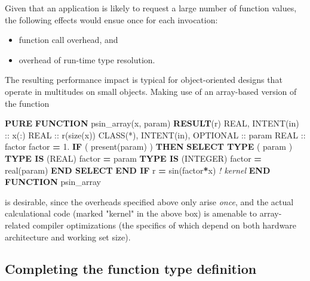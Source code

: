 \documentclass[]{scrartcl}
\newenvironment{Shaded}{}{}
\newcommand{\BuiltInTok}[1]{\textcolor[rgb]{0.00,0.50,0.00}{#1}}
\newcommand{\CommentTok}[1]{\textcolor[rgb]{0.38,0.63,0.69}{\textit{#1}}}
\newcommand{\DataTypeTok}[1]{\textcolor[rgb]{0.56,0.13,0.00}{#1}}
\newcommand{\FloatTok}[1]{\textcolor[rgb]{0.25,0.63,0.44}{#1}}
\newcommand{\FunctionTok}[1]{\textcolor[rgb]{0.02,0.16,0.49}{#1}}
\newcommand{\KeywordTok}[1]{\textcolor[rgb]{0.00,0.44,0.13}{\textbf{#1}}}
\newcommand{\NormalTok}[1]{#1}
\providecommand{\tightlist}{%
  \setlength{\itemsep}{0pt}\setlength{\parskip}{0pt}}
\begin{document}
Given that an application is likely to request a large number of
function values, the following effects would ensue once for each
invocation:

\begin{itemize}
\tightlist
\item
  function call overhead, and
\item
  overhead of run-time type resolution.
\end{itemize}

The resulting performance impact is typical for object-oriented designs
that operate in multitudes on small objects. Making use of an
array-based version of the function

\begin{Shaded}
\begin{Highlighting}[]
\KeywordTok{PURE} \KeywordTok{FUNCTION}\NormalTok{ psin\_array(x, param) }\KeywordTok{RESULT}\NormalTok{(r)}
   \DataTypeTok{REAL}\NormalTok{, }\DataTypeTok{INTENT(in)} \DataTypeTok{::}\NormalTok{ x(:)}
   \DataTypeTok{REAL} \DataTypeTok{::}\NormalTok{ r(}\FunctionTok{size}\NormalTok{(x))}
   \DataTypeTok{CLASS(*)}\NormalTok{, }\DataTypeTok{INTENT(in)}\NormalTok{, }\DataTypeTok{OPTIONAL} \DataTypeTok{::}\NormalTok{ param}
   \DataTypeTok{REAL} \DataTypeTok{::}\NormalTok{ factor}
\NormalTok{   factor }\KeywordTok{=} \FloatTok{1.}
   \KeywordTok{IF}\NormalTok{ ( }\FunctionTok{present}\NormalTok{(param) ) }\KeywordTok{THEN}
      \KeywordTok{SELECT TYPE}\NormalTok{ ( param )}
      \KeywordTok{TYPE IS}\NormalTok{ (}\DataTypeTok{REAL}\NormalTok{)}
\NormalTok{         factor }\KeywordTok{=}\NormalTok{ param}
      \KeywordTok{TYPE IS}\NormalTok{ (}\DataTypeTok{INTEGER}\NormalTok{)}
\NormalTok{         factor }\KeywordTok{=} \DataTypeTok{real(param)}
      \KeywordTok{END SELECT}
   \KeywordTok{END IF}
\NormalTok{   r }\KeywordTok{=} \BuiltInTok{sin}\NormalTok{(factor}\KeywordTok{*}\NormalTok{x)  }\CommentTok{! kernel}
\KeywordTok{END FUNCTION}\NormalTok{ psin\_array}
\end{Highlighting}
\end{Shaded}

is desirable, since the overheads specified above only arise
\emph{once}, and the actual calculational code (marked "kernel" in the
above box) is amenable to array-related compiler optimizations (the
specifics of which depend on both hardware architecture and working set
size).

\subsection{Completing the function type
definition}\label{completing-the-function-type-definition}
\end{document}

